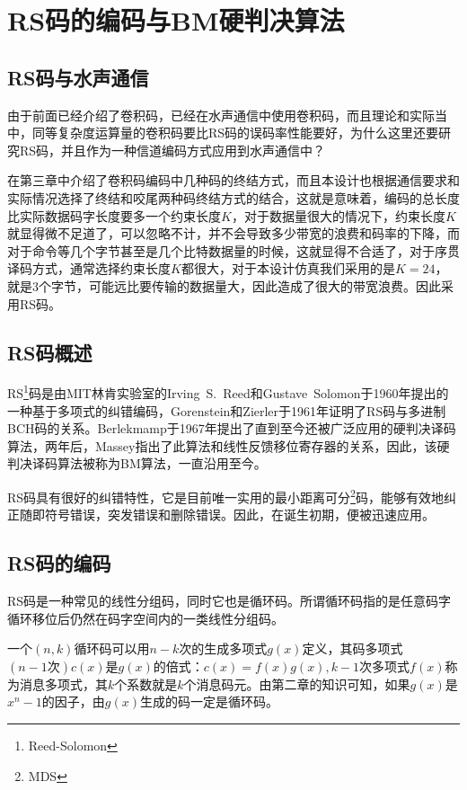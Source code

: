 %
\chapter{RS码的编码与BM硬判决算法}
\thispagestyle{empty}
\section{RS码与水声通信}
由于前面已经介绍了卷积码，已经在水声通信中使用卷积码，而且理论和实际当中，同等复杂度运算量的卷积码要比RS码的误码率性能要好，为什么这里还要研究RS码，并且作为一种信道编码方式应用到水声通信中？

在第三章中介绍了卷积码编码中几种码的终结方式，而且本设计也根据通信要求和实际情况选择了终结和咬尾两种码终结方式的结合，这就是意味着，编码的总长度比实际数据码字长度要多一个约束长度$K$，对于数据量很大的情况下，约束长度$K$就显得微不足道了，可以忽略不计，并不会导致多少带宽的浪费和码率的下降，而对于命令等几个字节甚至是几个比特数据量的时候，这就显得不合适了，对于序贯译码方式，通常选择约束长度$K$都很大，对于本设计仿真我们采用的是$K=24$，就是3个字节，可能远比要传输的数据量大，因此造成了很大的带宽浪费。因此采用RS码。

\section{RS码概述}
RS\footnote{Reed-Solomon}码是由MIT林肯实验室的Irving~S.~Reed和Gustave~Solomon\cite{Reed_RS}于1960年提出的一种基于多项式的纠错编码，Gorenstein和Zierler于1961年证明了RS码与多进制BCH码的关系。Berlekmamp于1967年提出了直到至今还被广泛应用的硬判决译码算法，两年后，Massey指出了此算法和线性反馈移位寄存器的关系，因此，该硬判决译码算法被称为BM算法，一直沿用至今。

RS码具有很好的纠错特性，它是目前唯一实用的最小距离可分\footnote{MDS}码，能够有效地纠正随即符号错误，突发错误和删除错误。因此，在诞生初期，便被迅速应用。
\section{RS码的编码}
RS码是一种常见的线性分组码，同时它也是循环码。所谓循环码指的是任意码字循环移位后仍然在码字空间内的一类线性分组码\cite{Coding_Fundation}。

一个$(n,k)$循环码可以用$n-k$次的生成多项式$g(x)$定义，其码多项式$(n-1\mbox{次})c(x)$是$g(x)$的倍式：$c(x)=f(x)g(x),k-1$次多项式$f(x)$称为消息多项式，其$k$个系数就是$k$个消息码元。由第二章的知识可知，如果$g(x)$是$x^n-1$的因子，由$g(x)$生成的码一定是循环码。

